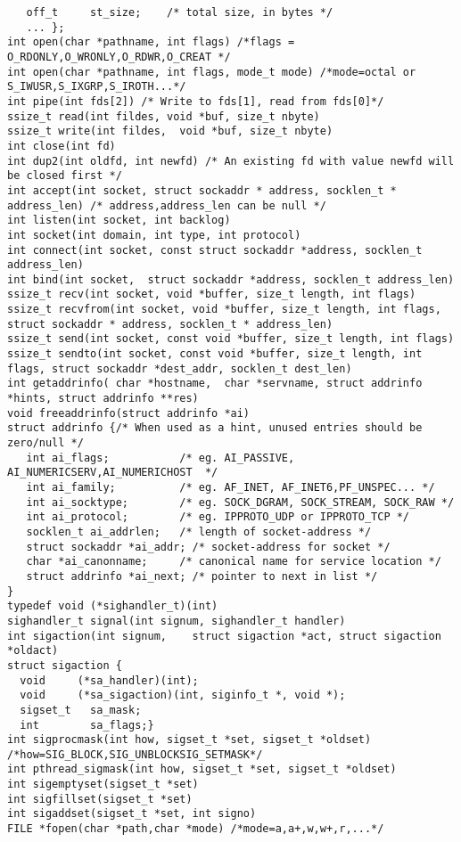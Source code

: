 \begin{verbatim}
   off_t     st_size;    /* total size, in bytes */
   ... };  
int open(char *pathname, int flags) /*flags = O_RDONLY,O_WRONLY,O_RDWR,O_CREAT */
int open(char *pathname, int flags, mode_t mode) /*mode=octal or S_IWUSR,S_IXGRP,S_IROTH...*/
int pipe(int fds[2]) /* Write to fds[1], read from fds[0]*/
ssize_t read(int fildes, void *buf, size_t nbyte)
ssize_t write(int fildes,  void *buf, size_t nbyte)
int close(int fd)
int dup2(int oldfd, int newfd) /* An existing fd with value newfd will be closed first */
int accept(int socket, struct sockaddr * address, socklen_t * address_len) /* address,address_len can be null */
int listen(int socket, int backlog)
int socket(int domain, int type, int protocol)
int connect(int socket, const struct sockaddr *address, socklen_t address_len)
int bind(int socket,  struct sockaddr *address, socklen_t address_len)
ssize_t recv(int socket, void *buffer, size_t length, int flags)
ssize_t recvfrom(int socket, void *buffer, size_t length, int flags, struct sockaddr * address, socklen_t * address_len)
ssize_t send(int socket, const void *buffer, size_t length, int flags)
ssize_t sendto(int socket, const void *buffer, size_t length, int flags, struct sockaddr *dest_addr, socklen_t dest_len)
int getaddrinfo( char *hostname,  char *servname, struct addrinfo *hints, struct addrinfo **res)
void freeaddrinfo(struct addrinfo *ai)
struct addrinfo {/* When used as a hint, unused entries should be zero/null */
   int ai_flags;           /* eg. AI_PASSIVE, AI_NUMERICSERV,AI_NUMERICHOST  */
   int ai_family;          /* eg. AF_INET, AF_INET6,PF_UNSPEC... */
   int ai_socktype;        /* eg. SOCK_DGRAM, SOCK_STREAM, SOCK_RAW */
   int ai_protocol;        /* eg. IPPROTO_UDP or IPPROTO_TCP */
   socklen_t ai_addrlen;   /* length of socket-address */
   struct sockaddr *ai_addr; /* socket-address for socket */
   char *ai_canonname;     /* canonical name for service location */
   struct addrinfo *ai_next; /* pointer to next in list */
} 
typedef void (*sighandler_t)(int)
sighandler_t signal(int signum, sighandler_t handler)
int sigaction(int signum,    struct sigaction *act, struct sigaction *oldact)
struct sigaction {
  void     (*sa_handler)(int);
  void     (*sa_sigaction)(int, siginfo_t *, void *);
  sigset_t   sa_mask;
  int        sa_flags;}
int sigprocmask(int how, sigset_t *set, sigset_t *oldset) /*how=SIG_BLOCK,SIG_UNBLOCKSIG_SETMASK*/
int pthread_sigmask(int how, sigset_t *set, sigset_t *oldset)
int sigemptyset(sigset_t *set)
int sigfillset(sigset_t *set)
int sigaddset(sigset_t *set, int signo)
FILE *fopen(char *path,char *mode) /*mode=a,a+,w,w+,r,...*/

\end{verbatim}
